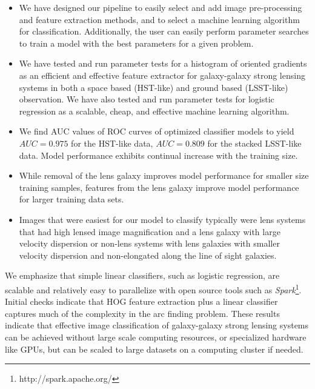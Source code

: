 \documentclass{emulateapj}
\begin{document}
\begin{itemize}

\item We have designed our pipeline to easily select and add image
  pre-processing and feature extraction methods, and to select a
  machine learning algorithm for classification.  Additionally, the
  user can easily perform parameter searches to train a model with the
  best parameters for a given problem.

\item We have tested and run parameter tests for a histogram of
  oriented gradients as an efficient and effective feature extractor
  for galaxy-galaxy strong lensing systems in both a space based
  (HST-like) and ground based (LSST-like) observation.  We have also
  tested and run parameter tests for logistic regression as a
  scalable, cheap, and effective machine learning algorithm.

\item We find AUC values of ROC curves of optimized classifier models
  to yield $AUC=0.975$ for the HST-like data, $AUC=0.809$ for the
  stacked LSST-like data.  Model performance exhibits continual
  increase with the training size.

\item While removal of the lens galaxy improves model performance for
  smaller size training samples, features from the lens galaxy improve
  model performance for larger training data sets.

\item Images that were easiest for our model to classify typically
  were lens systems that had high lensed image magnification and a
  lens galaxy with large velocity dispersion or non-lens systems with
  lens galaxies with smaller velocity dispersion and non-elongated
  along the line of sight galaxies.
\end{itemize}

We emphasize that simple linear classifiers, such as
logistic regression, are scalable and relatively easy to parallelize
with open source tools such as {\em
Spark}\footnote{http://spark.apache.org/}.  Initial checks
indicate that HOG feature extraction plus a linear
classifier captures much of the complexity in the arc finding problem.
These results indicate that effective image classification of
galaxy-galaxy strong lensing systems can be achieved without
large scale computing resources, or specialized hardware like GPUs,
but can be scaled to large datasets on a computing cluster if needed.
\end{document}
